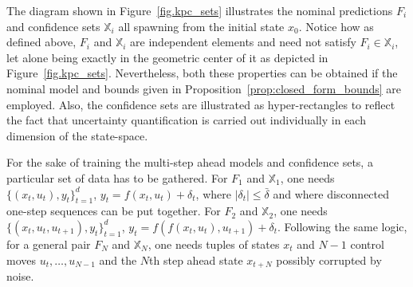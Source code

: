 
The diagram shown in Figure~\ref{fig.kpc_sets} illustrates the nominal predictions $F_i$ and confidence sets $\mathbb{X}_i$ all spawning from the initial state $x_0$. Notice how as defined above, $F_i$ and $\mathbb{X}_i$ are independent elements and need not satisfy $F_i \in \mathbb{X}_i$, let alone being exactly in the geometric center of it as depicted in Figure~\ref{fig.kpc_sets}. Nevertheless, both these properties can be obtained if the nominal model and bounds given in Proposition~\ref{prop:closed_form_bounds} are employed. Also, the confidence sets are illustrated as hyper-rectangles to reflect the fact that uncertainty quantification is carried out individually in each dimension of the state-space.

For the sake of training the multi-step ahead models and confidence sets, a particular set of data has to be gathered. For $F_1$ and $\mathbb{X}_1$, one needs $\{(x_t,u_t),y_t\}_{t=1}^d$, $y_t = f(x_t,u_t) + \delta_t$, where $|\delta_t| \leq \bar\delta$ and where disconnected one-step sequences can be put together. For $F_2$ and $\mathbb{X}_2$, one needs $\{(x_t,u_t,u_{t+1}),y_t\}_{t=1}^d$, $y_t = f(f(x_t,u_t),u_{t+1}) + \delta_t$. Following the same logic, for a general pair $F_N$ and $\mathbb{X}_N$, one needs tuples of states $x_t$ and $N-1$ control moves $u_t,\dots,u_{N-1}$ and the $N$th step ahead state $x_{t+N}$ possibly corrupted by noise. 


